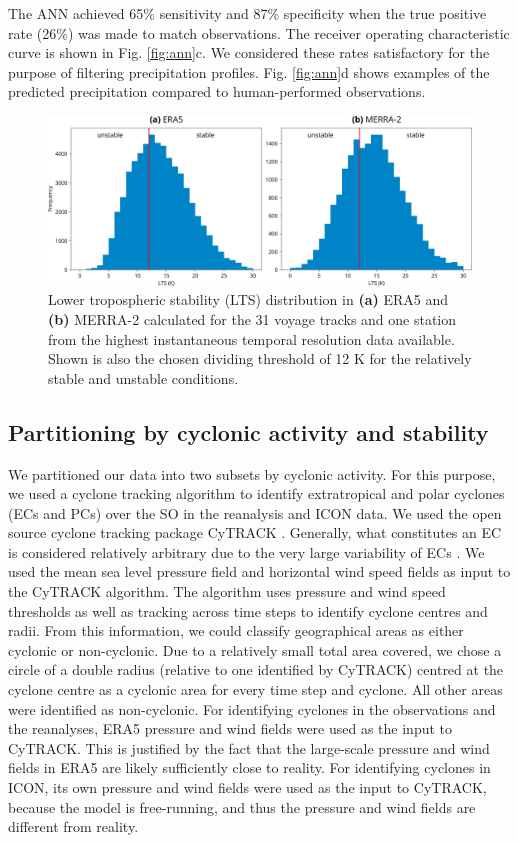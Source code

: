 \documentclass[12pt,a4paper]{article}
\begin{document}
The ANN achieved 65\% sensitivity and 87\% specificity when the true positive
rate (26\%) was made to match observations. The receiver operating
characteristic curve is shown in Fig. \ref{fig:ann}c. We considered these rates
satisfactory for the purpose of filtering precipitation profiles. Fig.
\ref{fig:ann}d shows examples of the predicted precipitation compared to
human-performed observations.

\begin{figure}[b!]
\centering
\includegraphics[width=\textwidth]{img/lts_dist.pdf}
\caption{
Lower tropospheric stability (LTS) distribution in \textbf{(a)} ERA5 and
\textbf{(b)} MERRA-2 calculated for the 31 voyage tracks and one station from
the highest instantaneous temporal resolution data available. Shown is also the
chosen dividing threshold of 12 K for the relatively stable and unstable
conditions.
}
\label{fig:lts}
\end{figure}

\subsection{Partitioning by cyclonic activity and stability}
\label{sec:cyclone-stability}

We partitioned our data into two subsets by cyclonic activity. For this
purpose, we used a cyclone tracking algorithm to identify extratropical and
polar cyclones (ECs and PCs) over the SO in the reanalysis and ICON data. We
used the open source cyclone tracking package CyTRACK
\citep{perez-alarcon2024}.  Generally, what constitutes an EC is considered
relatively arbitrary due to the very large variability of ECs \citep{neu2013}.
We used the mean sea level pressure field and horizontal wind speed fields as
input to the CyTRACK algorithm. The algorithm uses pressure and wind speed
thresholds as well as tracking across time steps to identify cyclone centres
and radii. From this information, we could classify geographical areas as
either cyclonic or non-cyclonic. Due to a relatively small total area covered,
we chose a circle of a double radius (relative to one identified by CyTRACK)
centred at the cyclone centre as a cyclonic area for every time step and
cyclone. All other areas were identified as non-cyclonic. For identifying
cyclones in the observations and the reanalyses, ERA5 pressure and wind fields
were used as the input to CyTRACK.  This is justified by the fact that the
large-scale pressure and wind fields in ERA5 are likely sufficiently close to
reality. For identifying cyclones in ICON, its own pressure and wind fields
were used as the input to CyTRACK, because the model is free-running, and thus
the pressure and wind fields are different from reality.
\end{document}
